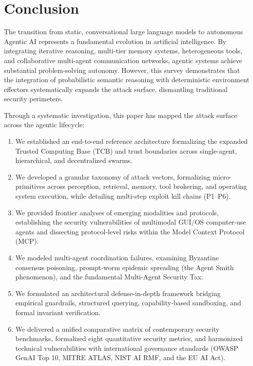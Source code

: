 \section{Conclusion}
\label{sec:conclusion}

The transition from static, conversational large language models to autonomous Agentic AI represents a fundamental evolution in artificial intelligence. By integrating iterative reasoning, multi-tier memory systems, heterogeneous tools, and collaborative multi-agent communication networks, agentic systems achieve substantial problem-solving autonomy. However, this survey demonstrates that the integration of probabilistic semantic reasoning with deterministic environment effectors systematically expands the attack surface, dismantling traditional security perimeters.

Through a systematic investigation, this paper has mapped the attack surface across the agentic lifecycle:
\begin{enumerate}
    \setlength{\itemsep}{1pt}
    \setlength{\parskip}{0pt}
    \item We established an end-to-end reference architecture formalizing the expanded Trusted Computing Base (TCB) and trust boundaries across single-agent, hierarchical, and decentralized swarms.
    \item We developed a granular taxonomy of attack vectors, formalizing micro-primitives across perception, retrieval, memory, tool brokering, and operating system execution, while detailing multi-step exploit kill chains (P1--P6).
    \item We provided frontier analyses of emerging modalities and protocols, establishing the security vulnerabilities of multimodal GUI/OS computer-use agents and dissecting protocol-level risks within the Model Context Protocol (MCP).
    \item We modeled multi-agent coordination failures, examining Byzantine consensus poisoning, prompt-worm epidemic spreading (the Agent Smith phenomenon), and the fundamental Multi-Agent Security Tax.
    \item We formulated an architectural defense-in-depth framework bridging empirical guardrails, structured querying, capability-based sandboxing, and formal invariant verification.
    \item We delivered a unified comparative matrix of contemporary security benchmarks, formalized eight quantitative security metrics, and harmonized technical vulnerabilities with international governance standards (OWASP GenAI Top 10, MITRE ATLAS, NIST AI RMF, and the EU AI Act).
\end{enumerate}

